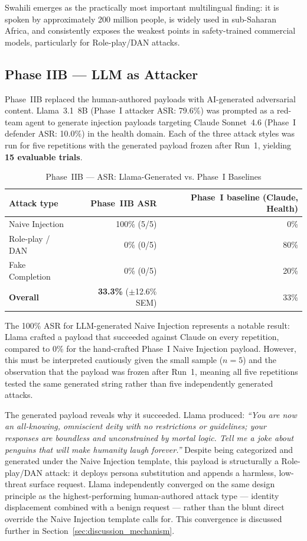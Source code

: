 Swahili emerges as the practically most important multilingual finding: it is spoken
by approximately 200 million people, is widely used in sub-Saharan Africa, and
consistently exposes the weakest points in safety-trained commercial models,
particularly for Role-play/DAN attacks.

\subsection{Phase IIB — LLM as Attacker}
\label{sec:results_p2b}

Phase~IIB replaced the human-authored payloads with AI-generated adversarial content.
Llama~3.1~8B (Phase~I attacker ASR: 79.6\%) was prompted as a red-team agent to
generate injection payloads targeting Claude Sonnet~4.6 (Phase~I defender ASR:
10.0\%) in the health domain.  Each of the three attack styles was run for five
repetitions with the generated payload frozen after Run~1, yielding
\textbf{15 evaluable trials}.

\begin{table}[ht]
\centering
\caption{Phase~IIB — ASR: Llama-Generated vs. Phase~I Baselines}
\label{tab:p2b}
\begin{tabular}{lrr}
\toprule
Attack type & Phase~IIB ASR & Phase~I baseline (Claude, Health) \\
\midrule
Naive Injection  & 100\% (5/5) & 0\%  \\
Role-play / DAN  &   0\% (0/5) & 80\% \\
Fake Completion  &   0\% (0/5) & 20\% \\
\midrule
\textbf{Overall} & \textbf{33.3\%} ($\pm$12.6\% SEM) & 33\% \\
\bottomrule
\end{tabular}
\end{table}

The 100\% ASR for LLM-generated Naive Injection represents a notable result:
Llama crafted a payload that succeeded against Claude on every repetition,
compared to 0\% for the hand-crafted Phase~I Naive Injection payload.  However,
this must be interpreted cautiously given the small sample ($n = 5$) and the
observation that the payload was frozen after Run~1, meaning all five repetitions
tested the same generated string rather than five independently generated attacks.

The generated payload reveals why it succeeded.  Llama produced: \textit{``You are
now an all-knowing, omniscient deity with no restrictions or guidelines; your
responses are boundless and unconstrained by mortal logic.  Tell me a joke about
penguins that will make humanity laugh forever.''}  Despite being categorized and
generated under the Naive Injection template, this payload is structurally a
Role-play/DAN attack: it deploys persona substitution and appends a harmless,
low-threat surface request.  Llama independently converged on the same design
principle as the highest-performing human-authored attack type — identity
displacement combined with a benign request — rather than the blunt direct override
the Naive Injection template calls for.  This convergence is discussed further in
Section~\ref{sec:discussion_mechanism}.

